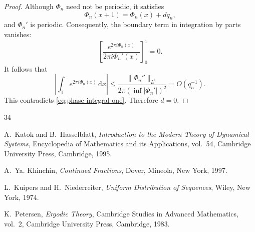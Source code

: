 \documentclass[10pt,a4paper]{amsart}
\newcommand{\T}{\mathbb{T}}
\newcommand{\dd}{\,\mathrm{d}}
\theoremstyle{plain}
\theoremstyle{remark}
\begin{document}
\begin{proof}
Although \(\Phi_n\) need not be periodic, it satisfies
\[
  \Phi_n(x+1)=\Phi_n(x)+dq_n,
\]
and \(\Phi_n'\) is periodic. Consequently, the boundary term in integration
by parts vanishes:
\[
  \left[
    \frac{e^{2\pi i\Phi_n(x)}}{2\pi i\Phi_n'(x)}
  \right]_{0}^{1}=0.
\]
It follows that
\[
  \left|
    \int_\T e^{2\pi i\Phi_n(x)}\dd x
  \right|
  \leq
  \frac{\|\Phi_n''\|_{L^1}}
       {2\pi(\inf|\Phi_n'|)^2}
  =O(q_n^{-1}).
\]
This contradicts \eqref{eq:phase-integral-one}. Therefore \(d=0\).
\end{proof}

\begin{thebibliography}{34}

A.~Katok and B.~Hasselblatt,
\emph{Introduction to the Modern Theory of Dynamical Systems},
Encyclopedia of Mathematics and its Applications, vol.~54,
Cambridge University Press, Cambridge, 1995.

A.~Ya. Khinchin,
\emph{Continued Fractions},
Dover, Mineola, New York, 1997.

L.~Kuipers and H.~Niederreiter,
\emph{Uniform Distribution of Sequences},
Wiley, New York, 1974.

K.~Petersen,
\emph{Ergodic Theory},
Cambridge Studies in Advanced Mathematics, vol.~2,
Cambridge University Press, Cambridge, 1983.

\end{thebibliography}
\end{document}
